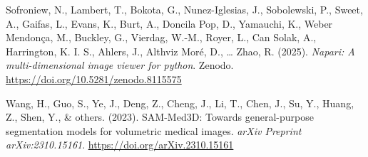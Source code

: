 \documentclass[
]{article}
\newlength{\cslhangindent}
\newenvironment{CSLReferences}[2] %
 {\begin{list}{}{%
  \setlength{\itemindent}{0pt}
  \setlength{\leftmargin}{0pt}
  \setlength{\parsep}{0pt}
  \ifodd #1
   \setlength{\leftmargin}{\cslhangindent}
   \setlength{\itemindent}{-1\cslhangindent}
  \fi
  \setlength{\itemsep}{#2\baselineskip}}}
 {\end{list}}
\begin{document}
\begin{CSLReferences}{1}{0}
Sofroniew, N., Lambert, T., Bokota, G., Nunez-Iglesias, J., Sobolewski,
P., Sweet, A., Gaifas, L., Evans, K., Burt, A., Doncila Pop, D.,
Yamauchi, K., Weber Mendonça, M., Buckley, G., Vierdag, W.-M., Royer,
L., Can Solak, A., Harrington, K. I. S., Ahlers, J., Althviz Moré, D.,
\ldots{} Zhao, R. (2025). \emph{Napari: A multi-dimensional image viewer
for python}. Zenodo. \url{https://doi.org/10.5281/zenodo.8115575}

Wang, H., Guo, S., Ye, J., Deng, Z., Cheng, J., Li, T., Chen, J., Su,
Y., Huang, Z., Shen, Y., \& others. (2023). {SAM-Med3D}: Towards
general-purpose segmentation models for volumetric medical images.
\emph{arXiv Preprint arXiv:2310.15161}.
\url{https://doi.org/arXiv.2310.15161}

\end{CSLReferences}
\end{document}
